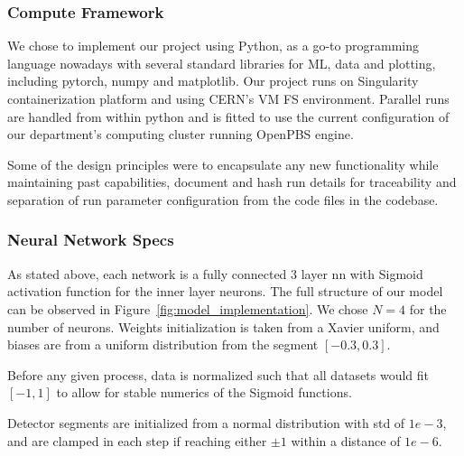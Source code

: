 \documentclass[../../ddppaper2.tex]{subfiles}
\begin{document}


\subsubsection{Compute Framework}

We chose to implement our project using Python, as a go-to programming language nowadays with several standard libraries for ML, data and plotting, including pytorch, numpy and matplotlib. Our project runs on Singularity containerization platform and using CERN's VM FS environment. Parallel runs are handled from within python and is fitted to use the current configuration of our department's computing cluster running OpenPBS engine.

Some of the design principles were to encapsulate any new functionality while maintaining past capabilities, document and hash run details for traceability and separation of run parameter configuration from the code files in the codebase.

\subsubsection{Neural Network Specs}

As stated above, each network is a fully connected 3 layer \gls{nn} with Sigmoid activation function for the inner layer neurons. The full structure of our model can be observed in Figure~\ref{fig:model_implementation}. We chose $N=4$ for the number of neurons. Weights initialization is taken from a Xavier uniform, and biases are from a uniform distribution from the segment $[-0.3, 0.3]$.

Before any given process, data is normalized such that all datasets would fit $[-1, 1]$ to allow for stable numerics of the Sigmoid functions.

Detector segments are initialized from a normal distribution with std of $1e-3$, and are clamped in each step if reaching either $\pm 1$ within a distance of $1e-6$.
\end{document}
